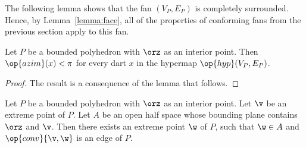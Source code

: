 The following lemma shows that the fan $(V_P,E_P)$ is completely
surrounded.  Hence, by Lemma~\ref{lemma:face}, all of the properties
of conforming fans from the previous section apply to this fan.

\begin{lemma}[]\cutrate{} 
Let $P$ be a bounded polyhedron
with $\orz$ as an interior point.  Then $\op{azim}(x) < \pi$ for
every dart $x$ in the hypermap $\op{hyp}(V_P,E_P)$.
\end{lemma}
%
%
%
%

\begin{proof}  The result is a consequence of the
lemma that follows.
\end{proof}

\begin{lemma}[]
  Let $P$ be a bounded polyhedron with $\orz$ as an interior point.
  Let $\v$ be an extreme point of $P$.  Let $A$ be an open half space
  whose bounding plane contains $\orz$ and $\v$.  Then there exists an
  extreme point $\w$ of $P$, such that $\w\in A$ and
  $\op{conv}\{\v,\w\}$ is an edge of $P$.
\end{lemma}

